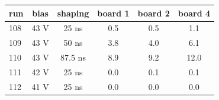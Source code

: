 \begin{tabular}{lccccc}
\toprule
run & bias & shaping & board 1 & board 2 & board 4 \\
\midrule
108 & 43 V & 25 ns & 0.5 & 0.5 & 1.1 \\
109 & 43 V & 50 ns & 3.8 & 4.0 & 6.1 \\
110 & 43 V & 87.5 ns & 8.9 & 9.2 & 12.0 \\
111 & 42 V & 25 ns & 0.0 & 0.1 & 0.1 \\
112 & 41 V & 25 ns & 0.0 & 0.0 & 0.0 \\
\bottomrule
\end{tabular}
